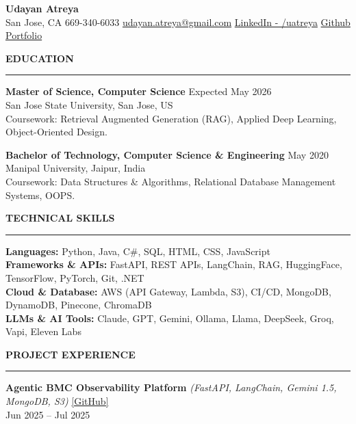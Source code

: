 \documentclass[letterpaper,10.5pt]{extarticle}
\newcommand{\resumesection}[1]{%
    \vspace{6pt}%
    \noindent\textbf{#1}\vspace{-5pt}%
    \\\noindent\rule{\textwidth}{0.5pt}%
    \vspace{1pt}%
}
\begin{document}
\begin{center}
    {\LARGE\textbf{Udayan Atreya}}\\[3pt]
    {\fontsize{11}{13.2}\selectfont
    San Jose, CA \textbar{} 669-340-6033 \textbar{}
    \href{mailto:udayan.atreya@gmail.com}{udayan.atreya@gmail.com} \textbar{}
    \href{https://www.linkedin.com/in/uatreya/}{LinkedIn - /uatreya} \textbar{}
    \href{https://github.com/slowloris-98/}{Github} \textbar{}
    \href{https://udayan-atreya.vercel.app/}{Portfolio}}
\end{center}

\resumesection{EDUCATION}

\noindent\textbf{Master of Science, Computer Science} \hfill Expected May 2026\\
San Jose State University, San Jose, US\\
Coursework: Retrieval Augmented Generation (RAG), Applied Deep Learning, Object-Oriented Design.

\vspace{5pt}

\noindent\textbf{Bachelor of Technology, Computer Science \& Engineering} \hfill May 2020\\
Manipal University, Jaipur, India\\
Coursework: Data Structures \& Algorithms, Relational Database Management Systems, OOPS.

\resumesection{TECHNICAL SKILLS}

\noindent\textbf{Languages:} Python, Java, C\#, SQL, HTML, CSS, JavaScript\\
\noindent\textbf{Frameworks \& APIs:} FastAPI, REST APIs, LangChain, RAG, HuggingFace, TensorFlow, PyTorch, Git, .NET\\
\noindent\textbf{Cloud \& Database:} AWS (API Gateway, Lambda, S3), CI/CD, MongoDB, DynamoDB, Pinecone, ChromaDB\\
\noindent\textbf{LLMs \& AI Tools:} Claude, GPT, Gemini, Ollama, Llama, DeepSeek, Groq, Vapi, Eleven Labs

\resumesection{PROJECT EXPERIENCE}

\noindent\textbf{Agentic BMC Observability Platform} \textit{(FastAPI, LangChain, Gemini 1.5, MongoDB, S3)} \hfill \href{https://github.com/slowloris-98/Agentic-Oberservability-BMC}{[GitHub]}\\
Jun 2025 -- Jul 2025
\end{document}
